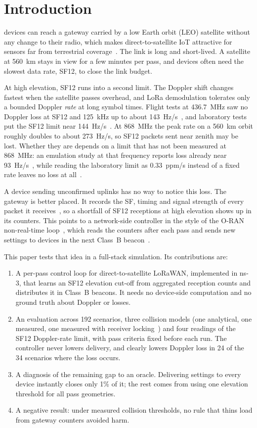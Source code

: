 \documentclass[journal]{IEEEtran}
\begin{document}
\section{Introduction}
 devices can reach a gateway carried by a low Earth orbit (LEO) satellite without any change to their radio, which makes direct-to-satellite IoT attractive for sensors far from terrestrial coverage~\cite{alvarez2022,asadullah2024}. The link is long and short-lived. A satellite at 560~km stays in view for a few minutes per pass, and devices often need the slowest data rate, SF12, to close the link budget.

At high elevation, SF12 runs into a second limit. The Doppler shift changes fastest when the satellite passes overhead, and LoRa demodulation tolerates only a bounded Doppler \emph{rate} at long symbol times. Flight tests at 436.7~MHz saw no Doppler loss at SF12 and 125~kHz up to about 143~Hz/s~\cite{zadorozhny2022}, and laboratory tests put the SF12 limit near 144~Hz/s~\cite{doroshkin2019}. At 868~MHz the peak rate on a 560~km orbit roughly doubles to about 273~Hz/s, so SF12 packets sent near zenith may be lost. Whether they are depends on a limit that has not been measured at 868~MHz: an emulation study at that frequency reports loss already near 93~Hz/s~\cite{colombo2022}, while reading the laboratory limit as 0.33~ppm/s instead of a fixed rate leaves no loss at all~\cite{doroshkin2019}.

A device sending unconfirmed uplinks has no way to notice this loss. The gateway is better placed. It records the SF, timing and signal strength of every packet it receives~\cite{sx1301}, so a shortfall of SF12 receptions at high elevation shows up in its counters. This points to a network-side controller in the style of the O-RAN non-real-time loop~\cite{tarchi2026}, which reads the counters after each pass and sends new settings to devices in the next Class~B beacon~\cite{lorawanL2}.

This paper tests that idea in a full-stack simulation. Its contributions are:
\begin{enumerate}
\item A per-pass control loop for direct-to-satellite LoRaWAN, implemented in ns-3, that learns an SF12 elevation cut-off from aggregated reception counts and distributes it in Class~B beacons. It needs no device-side computation and no ground truth about Doppler or losses.
\item An evaluation across 192 scenarios, three collision models (one analytical, one measured, one measured with receiver locking~\cite{goursaud2015,croce2018,bor2016}) and four readings of the SF12 Doppler-rate limit, with pass criteria fixed before each run. The controller never lowers delivery, and clearly lowers Doppler loss in 24 of the 34 scenarios where the loss occurs.
\item A diagnosis of the remaining gap to an oracle. Delivering settings to every device instantly closes only 1\% of it; the rest comes from using one elevation threshold for all pass geometries.
\item A negative result: under measured collision thresholds, no rule that thins load from gateway counters avoided harm.
\end{enumerate}
\end{document}
